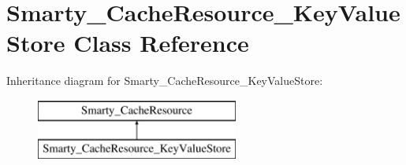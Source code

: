 \hypertarget{class_smarty___cache_resource___key_value_store}{}\section{Smarty\+\_\+\+Cache\+Resource\+\_\+\+Key\+Value\+Store Class Reference}
\label{class_smarty___cache_resource___key_value_store}
Inheritance diagram for Smarty\+\_\+\+Cache\+Resource\+\_\+\+Key\+Value\+Store\+:\begin{figure}[H]
\begin{center}
\leavevmode
\includegraphics[height=2.000000cm]{class_smarty___cache_resource___key_value_store}
\end{center}
\end{figure}
